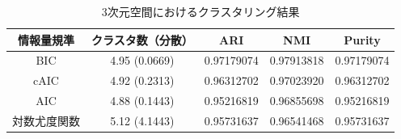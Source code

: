 \begin{table}[htb]
  \centering
  \caption{3次元空間におけるクラスタリング結果}
  \label{table:3dim}
  \begin{tabular}{|c|c|c|c|c|} \hline
    情報量規準 & クラスタ数（分散） & ARI & NMI & Purity \\\hline
    BIC & 4.95 (0.0669) & 0.97179074 & 0.97913818 & 0.97179074\\
    cAIC & 4.92 (0.2313) & 0.96312702 & 0.97023920 & 0.96312702\\
    AIC & 4.88 (0.1443) & 0.95216819 & 0.96855698 & 0.95216819\\
    対数尤度関数 & 5.12 (4.1443) & 0.95731637 & 0.96541468 & 0.95731637\\\hline 
  \end{tabular}
\end{table}
